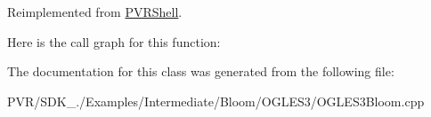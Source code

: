 Reimplemented from \hyperlink{class_p_v_r_shell_ae0eb5f797cbe993a22b8659f9c332578}{P\+V\+R\+Shell}.



Here is the call graph for this function\+:




The documentation for this class was generated from the following file\+:\begin{DoxyCompactItemize}
\item 
P\+V\+R/\+S\+D\+K\+\_./\+Examples/\+Intermediate/\+Bloom/\+O\+G\+L\+E\+S3/O\+G\+L\+E\+S3\+Bloom.\+cpp\end{DoxyCompactItemize}
